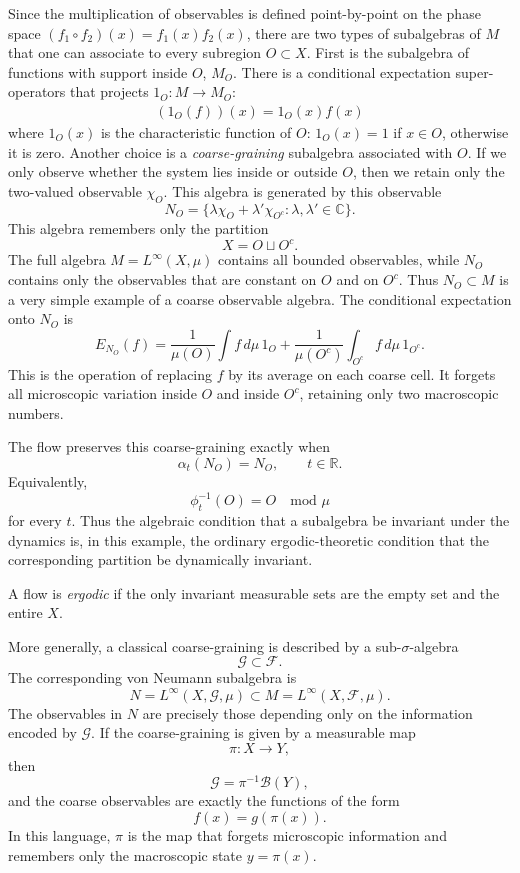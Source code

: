 \documentclass[a4paper,11pt]{article}
\theoremstyle{definition}
\begin{document}
Since the multiplication of observables is defined point-by-point on the phase space $(f_1\circ f_2)(x)=f_1(x)f_2(x)$, there are two types of subalgebras of $M$ that one can associate to every subregion $O\subset X$. First is the subalgebra of functions with support inside $O$, $M_O$. There is a conditional expectation super-operators that projects $1_O:M\to M_O$:
\begin{align}
    (1_O(f))(x)=1_O(x) f(x)
\end{align}
where $1_O(x)$ is the characteristic function of $O$: $1_O(x)=1$ if $x\in O$, otherwise it is zero.
Another choice is a {\it coarse-graining} subalgebra associated with $O$. If we only observe whether the system lies inside or outside \(O\), then we retain only the two-valued observable \(\chi_O\). This algebra is generated by this observable
\[
N_O=\{\lambda \chi_O+\lambda' \chi_{O^c}:\lambda,\lambda'\in\mathbb C\}.
\]
This algebra remembers only the partition
\[
X=O\sqcup O^c.
\]
The full algebra \(M=L^\infty(X,\mu)\) contains all bounded observables, while \(N_O\) contains only the observables that are constant on \(O\) and on \(O^c\). Thus \(N_O\subset M\) is a very simple example of a coarse observable algebra. The conditional expectation onto \(N_O\) is
\[
E_{N_O}(f)
=
\frac{1}{\mu(O)}\int f\,d\mu\, 1_O
+
\frac{1}{\mu(O^c)}\int_{O^c} f\,d\mu\, 1_{O^c}.
\]
This is the operation of replacing \(f\) by its average on each coarse cell. It forgets all microscopic variation inside \(O\) and inside \(O^c\), retaining only two macroscopic numbers.

The flow preserves this coarse-graining exactly when
\[
\alpha_t(N_O)=N_O,\qquad t\in\mathbb R.
\]
Equivalently,
\[
\phi_t^{-1}(O)=O
\quad \text{mod } \mu
\]
for every \(t\). Thus the algebraic condition that a subalgebra be invariant under the dynamics is, in this example, the ordinary ergodic-theoretic condition that the corresponding partition be dynamically invariant.

A flow is {\it ergodic} if the only invariant measurable sets are the empty set and the entire $X$. 

More generally, a classical coarse-graining is described by a sub-\(\sigma\)-algebra
\[
\mathcal G\subset \mathcal F.
\]
The corresponding von Neumann subalgebra is
\[
N=L^\infty(X,\mathcal G,\mu)\subset M=L^\infty(X,\mathcal F,\mu).
\]
The observables in \(N\) are precisely those depending only on the information encoded by \(\mathcal G\). If the coarse-graining is given by a measurable map
\[
\pi:X\to Y,
\]
then
\[
\mathcal G=\pi^{-1}\mathcal B(Y),
\]
and the coarse observables are exactly the functions of the form
\[
f(x)=g(\pi(x)).
\]
In this language, \(\pi\) is the map that forgets microscopic information and remembers only the macroscopic state \(y=\pi(x)\).
\end{document}
